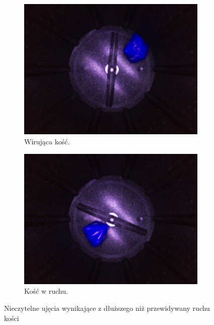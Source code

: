 \begin{figure}[h]
    \centering
    \begin{subfigure}[t]{0.45\linewidth}
        \centering
        \includegraphics[width=\linewidth]{chapters/04-czytanie/figures/wir}
        \caption{Wirująca kość.}
        \label{fig:wir}
    \end{subfigure}
    \hfill
    \begin{subfigure}[t]{0.45\linewidth}
        \centering
        \includegraphics[width=\linewidth]{chapters/04-czytanie/figures/wir2}
        \caption{Kość w ruchu.}
        \label{fig:wir2}
    \end{subfigure}
    \caption{Nieczytelne ujęcia wynikające z dłuższego niż przewidywany ruchu kości}
    \label{fig:wircombined}
\end{figure}



